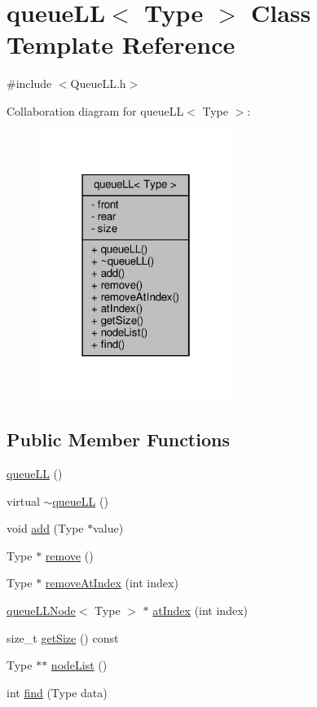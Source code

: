 \hypertarget{classqueue_l_l}{}\section{queue\+LL$<$ Type $>$ Class Template Reference}
\label{classqueue_l_l}


{\ttfamily \#include $<$Queue\+L\+L.\+h$>$}



Collaboration diagram for queue\+LL$<$ Type $>$\+:
\nopagebreak
\begin{figure}[H]
\begin{center}
\leavevmode
\includegraphics[width=178pt]{classqueue_l_l__coll__graph}
\end{center}
\end{figure}
\subsection*{Public Member Functions}
\begin{DoxyCompactItemize}
\item 
\hyperlink{classqueue_l_l_a8d7c7b45de1dcf799d5c7bad996094eb}{queue\+LL} ()
\item 
virtual \hyperlink{classqueue_l_l_af1560879b08f475cccfca106e0320cf6}{$\sim$queue\+LL} ()
\item 
void \hyperlink{classqueue_l_l_adcbcc26433da2c9d17b6cf0802d1d7d2}{add} (Type $\ast$value)
\item 
Type $\ast$ \hyperlink{classqueue_l_l_a4204a9db973b69be5824ca2495130b40}{remove} ()
\item 
Type $\ast$ \hyperlink{classqueue_l_l_abe3f175ee8c25c55d18650c5b13297b1}{remove\+At\+Index} (int index)
\item 
\hyperlink{classqueue_l_l_node}{queue\+L\+L\+Node}$<$ Type $>$ $\ast$ \hyperlink{classqueue_l_l_a6c8873be0f08b3b2e83a24469fbfaa5d}{at\+Index} (int index)
\item 
size\+\_\+t \hyperlink{classqueue_l_l_a8969feebcb563f0b489bc112422b9563}{get\+Size} () const
\item 
Type $\ast$$\ast$ \hyperlink{classqueue_l_l_ae9a479b9463f51c5148dd80b68335d32}{node\+List} ()
\item 
int \hyperlink{classqueue_l_l_af46d9d07b7528da834c2c37d752c29f5}{find} (Type data)
\end{DoxyCompactItemize}
